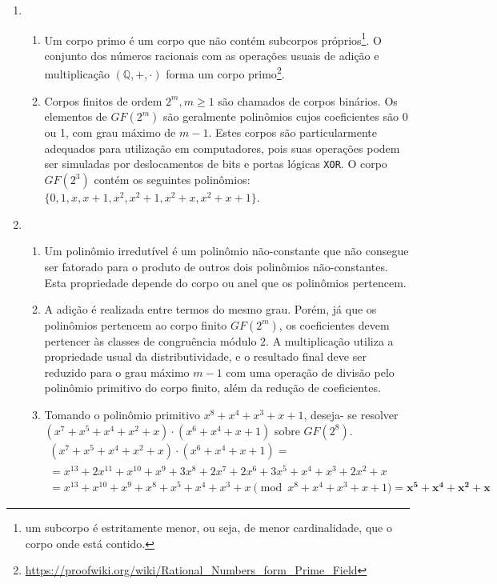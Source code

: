 \documentclass[fleqn]{article}
\begin{document}
\begin{enumerate}[label=\textbf{\arabic*})]
\begin{enumerate}
\end{enumerate}

\item

\begin{enumerate}

\item Um corpo primo é um corpo que não contém subcorpos próprios\footnote{um
subcorpo é estritamente menor, ou seja, de menor cardinalidade, que o corpo
onde está contido.}. O conjunto dos números racionais com as operações usuais
de adição e multiplicação $(\mathbb{Q}, +, \cdot)$ forma um corpo
primo\footnote{\url{
https://proofwiki.org/wiki/Rational_Numbers_form_Prime_Field}}.

\item Corpos finitos de ordem $2^m, m \geq 1$ são chamados de corpos binários.
Os elementos de $GF(2^m)$ são geralmente polinômios cujos coeficientes são 0
ou 1, com grau máximo de $m - 1$. Estes corpos são particularmente adequados
para utilização em computadores, pois suas operações podem ser simuladas por
deslocamentos de bits e portas lógicas \texttt{XOR}. O corpo $GF(2^3)$ contém
os seguintes polinômios:
$\{0, 1, x, x + 1, x^2, x^2 + 1, x^2 + x, x^2 + x + 1\}$.

\end{enumerate}

\item

\begin{enumerate}

\item Um polinômio irredutível é um polinômio não-constante que não consegue
ser fatorado para o produto de outros dois polinômios não-constantes. Esta
propriedade depende do corpo ou anel que os polinômios pertencem.

\item A adição é realizada entre termos do mesmo grau. Porém, já que os
polinômios pertencem ao corpo finito $GF(2^m)$, os coeficientes devem pertencer
às classes de congruência módulo $2$. A multiplicação utiliza a propriedade
usual da distributividade, e o resultado final deve ser reduzido para o grau
máximo $m - 1$ com uma operação de divisão pelo polinômio primitivo do corpo
finito, além da redução de coeficientes.

\item Tomando o polinômio primitivo $x^8 + x^4 + x^3 + x + 1$, deseja- se
resolver $(x^7 + x^5 + x^4 + x^2 + x) \cdot (x^6 + x^4 + x + 1)$ sobre
$GF(2^8)$.
\begin{multline*}
(x^7 + x^5 + x^4 + x^2 + x) \cdot (x^6 + x^4 + x + 1) = \\
= x^{13} + 2x^{11} + x^{10} + x^9 + 3x^8 + 2x^7
+ 2x^6 + 3x^5 + x^4 + x^3 + 2x^2 + x \\
= x^{13} + x^{10} + x^9 + x^8 + x^5 + x^4 + x^3 + x
\pmod{x^8 + x^4 + x^3 + x + 1}
= \boldsymbol{x^5 + x^4 + x^2 + x}
\end{multline*}


\end{enumerate}
\end{enumerate}
\end{document}
